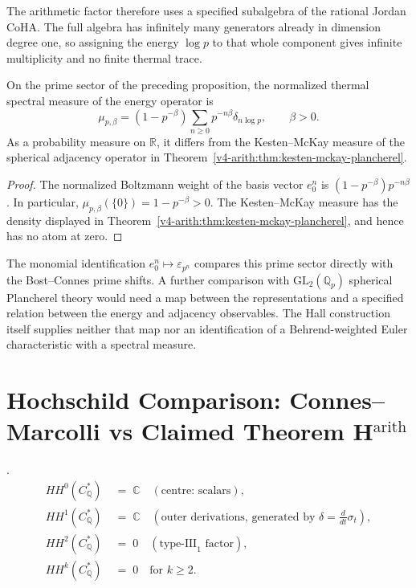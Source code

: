The arithmetic factor therefore uses a specified subalgebra of the
rational Jordan CoHA. The full algebra has infinitely many generators
already in dimension degree one, so assigning the energy $\log p$
to that whole component gives infinite multiplicity and no finite
thermal trace.

\begin{proposition}
\label{v4-arith:prop:HY-BC-Soibelman-dictionary}
\ClaimStatusProvedHere{}
On the prime sector of the preceding proposition, the normalized
thermal spectral measure of the energy operator is
\[
 \mu_{p,\beta}=(1-p^{-\beta})
       \sum_{n\geq0}p^{-n\beta}\delta_{n\log p},\qquad \beta>0.
\]
As a probability measure on $\mathbb R$, it differs from the
Kesten--McKay measure of the spherical adjacency operator in
Theorem~\ref{v4-arith:thm:kesten-mckay-plancherel}.
\end{proposition}

\begin{proof}
The normalized Boltzmann weight of the basis vector $e_0^n$ is
$(1-p^{-\beta})p^{-n\beta}$. In particular,
$\mu_{p,\beta}(\{0\})=1-p^{-\beta}>0$.
The Kesten--McKay measure has the density displayed in
Theorem~\ref{v4-arith:thm:kesten-mckay-plancherel}, and hence has no atom
at zero.
\end{proof}

The monomial identification $e_0^n\mapsto\varepsilon_{p^n}$ compares
this prime sector directly with the Bost--Connes prime shifts.
A further comparison with $\mathrm{GL}_2(\mathbb Q_p)$ spherical
Plancherel theory would need a map between the representations and a
specified relation between the energy and adjacency observables.
The Hall construction itself supplies neither that map nor an
identification of a Behrend-weighted Euler characteristic with a
spectral measure.

\section{Hochschild Comparison: Connes--Marcolli vs Claimed Theorem H\(^{\mathrm{arith}}\)}
\label{v4-arith:cs:HH-comparison}

\begin{theorem}
\label{v4-arith:thm:CM-HH-BC}
\ClaimStatusProvedElsewhere.
\begin{align}
HH^{0}(C_{\mathbb{Q}}^{*})\;&=\;\mathbb{C}\quad(\text{centre: scalars}), \\
HH^{1}(C_{\mathbb{Q}}^{*})\;&=\;\mathbb{C}\quad(\text{outer derivations, generated by }\delta=\frac{d}{dt}\sigma_{t}), \\
HH^{2}(C_{\mathbb{Q}}^{*})\;&=\;0\quad(\text{type-III}_{1}\text{ factor}), \\
HH^{k}(C_{\mathbb{Q}}^{*})\;&=\;0\quad\text{for }k\geq 2.
\end{align}
\end{theorem}

